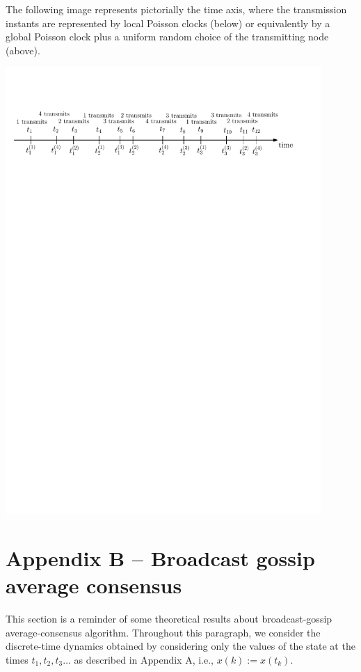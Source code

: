 \documentclass[oneside]{article}
\begin{document}
The following image represents pictorially
the time axis, where the transmission instants are represented by local Poisson clocks (below) or equivalently by a global Poisson clock plus a uniform random choice of the transmitting node (above).
\begin{center}
\includegraphics[width=0.9\textwidth]{timeline}
\end{center}






\section*{Appendix B -- Broadcast gossip average consensus}

This section is a reminder of some theoretical results about broadcast-gossip average-consensus algorithm.
%
Throughout this paragraph, we consider the discrete-time dynamics obtained by considering only the values of the state at the times $t_1, t_2, t_3 \dots$ as described in Appendix A, i.e., $x(k) := x(t_k)$. \\
\end{document}
